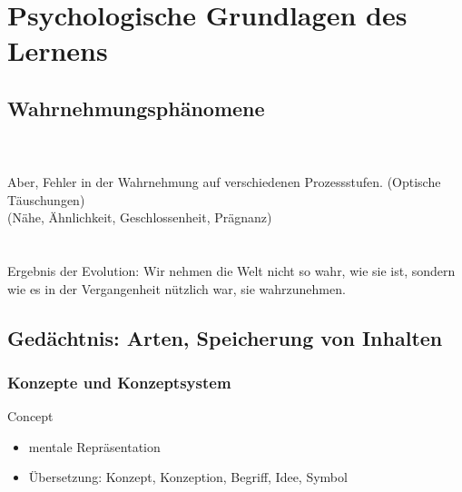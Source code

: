 \documentclass[a4paper]{article}
\begin{document}
\section{Psychologische Grundlagen des Lernens}

\subsection{Wahrnehmungsphänomene}

\\~\\
Aber, Fehler in der Wahrnehmung auf verschiedenen Prozessstufen. (Optische Täuschungen)\\
(Nähe, Ähnlichkeit, Geschlossenheit, Prägnanz)\\~\\
\\
Ergebnis der Evolution: Wir nehmen die Welt nicht so wahr, wie sie ist, sondern wie es in der Vergangenheit nützlich war, sie wahrzunehmen.

\subsection{Gedächtnis: Arten, Speicherung von Inhalten}

\subsubsection{Konzepte und Konzeptsystem}

Concept
\begin{itemize}
	\item mentale Repräsentation
	\item Übersetzung: Konzept, Konzeption, Begriff, Idee, Symbol
\end{itemize}
\end{document}
